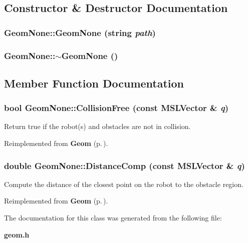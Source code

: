 \subsection{Constructor \& Destructor Documentation}
\subsubsection{\setlength{\rightskip}{0pt plus 5cm}Geom\-None::Geom\-None (string {\em path})}\label{class_GeomNone_a0}


\subsubsection{\setlength{\rightskip}{0pt plus 5cm}Geom\-None::$\sim$Geom\-None ()\hspace{0.3cm}{\tt  [inline, virtual]}}\label{class_GeomNone_a1}




\subsection{Member Function Documentation}
\subsubsection{\setlength{\rightskip}{0pt plus 5cm}bool Geom\-None::Collision\-Free (const {\bf MSLVector} \& {\em q})\hspace{0.3cm}{\tt  [inline, virtual]}}\label{class_GeomNone_a2}


Return true if the robot(s) and obstacles are not in collision.



Reimplemented from {\bf Geom} {\rm (p.\,\pageref{class_Geom_a2})}.
\subsubsection{\setlength{\rightskip}{0pt plus 5cm}double Geom\-None::Distance\-Comp (const {\bf MSLVector} \& {\em q})\hspace{0.3cm}{\tt  [inline, virtual]}}\label{class_GeomNone_a3}


Compute the distance of the closest point on the robot to the obstacle region.



Reimplemented from {\bf Geom} {\rm (p.\,\pageref{class_Geom_a3})}.

The documentation for this class was generated from the following file:\begin{CompactItemize}
\item 
{\bf geom.h}\end{CompactItemize}
